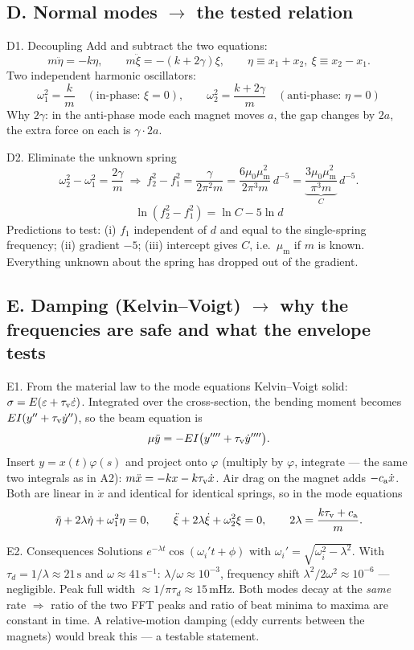 \documentclass[11pt,a4paper]{article}
\newcommand{\muz}{\mu_0}\newcommand{\mum}{\mu_{\mathrm m}}\newcommand{\dd}{\mathrm{d}}\newcommand{\un}[1]{\,\mathrm{#1}}\newcommand{\Lag}{\mathcal L}
\begin{document}
\subsection*{D. Normal modes $\to$ the tested relation}
\begin{stepbox}{D1. Decoupling}
Add and subtract the two equations:
\[ m\ddot\eta=-k\eta,\qquad m\ddot\xi=-(k+2\gamma)\xi,\qquad \eta\equiv x_1+x_2,\ \xi\equiv x_2-x_1. \]
Two independent harmonic oscillators:
\[ \boxed{\omega_1^2=\frac km\quad(\text{in-phase: }\xi=0),\qquad \omega_2^2=\frac{k+2\gamma}m\quad(\text{anti-phase: }\eta=0)} \]
Why $2\gamma$: in the anti-phase mode each magnet moves $a$, the gap changes by $2a$, the extra force on each is $\gamma\cdot2a$.
\end{stepbox}
\begin{stepbox}{D2. Eliminate the unknown spring}
\[ \omega_2^2-\omega_1^2=\frac{2\gamma}{m}\ \Rightarrow\ f_2^2-f_1^2=\frac{\gamma}{2\pi^2m}=\frac{6\muz\mum^2}{2\pi^3m}\,d^{-5}=\underbrace{\frac{3\muz\mum^2}{\pi^3m}}_{C}\,d^{-5}. \]
\[ \boxed{\ln(f_2^2-f_1^2)=\ln C-5\ln d} \]
Predictions to test: (i) $f_1$ independent of $d$ and equal to the single-spring frequency; (ii) gradient $-5$; (iii) intercept gives $C$, i.e.\ $\mum$ if $m$ is known. Everything unknown about the spring has dropped out of the gradient.
\end{stepbox}

\subsection*{E. Damping (Kelvin--Voigt) $\to$ why the frequencies are safe and what the envelope tests}
\begin{stepbox}{E1. From the material law to the mode equations}
Kelvin--Voigt solid: $\sigma=E(\varepsilon+\tau_{\rm v}\dot\varepsilon)$. Integrated over the cross-section, the bending moment becomes $EI(y''+\tau_{\rm v}\dot y'')$, so the beam equation is
\[ \mu\ddot y=-EI\bigl(y''''+\tau_{\rm v}\dot y''''\bigr). \]
Insert $y=x(t)\varphi(s)$ and project onto $\varphi$ (multiply by $\varphi$, integrate --- the same two integrals as in A2): $m\ddot x=-kx-k\tau_{\rm v}\dot x$. Air drag on the magnet adds $-c_{\rm a}\dot x$. Both are linear in $\dot x$ and identical for identical springs, so in the mode equations
\[ \ddot\eta+2\lambda\dot\eta+\omega_1^2\eta=0,\qquad \ddot\xi+2\lambda\dot\xi+\omega_2^2\xi=0,\qquad 2\lambda=\frac{k\tau_{\rm v}+c_{\rm a}}{m}. \]
\end{stepbox}
\begin{stepbox}{E2. Consequences}
Solutions $e^{-\lambda t}\cos(\omega_i't+\phi)$ with $\omega_i'=\sqrt{\omega_i^2-\lambda^2}$. With $\tau_d=1/\lambda\approx21\un{s}$ and $\omega\approx41\un{s^{-1}}$: $\lambda/\omega\approx10^{-3}$, frequency shift $\lambda^2/2\omega^2\approx10^{-6}$ --- negligible. Peak full width $\approx1/\pi\tau_d\approx15\un{mHz}$. Both modes decay at the \emph{same} rate $\Rightarrow$ ratio of the two FFT peaks and ratio of beat minima to maxima are constant in time. A relative-motion damping (eddy currents between the magnets) would break this --- a testable statement.
\end{stepbox}
\end{document}
